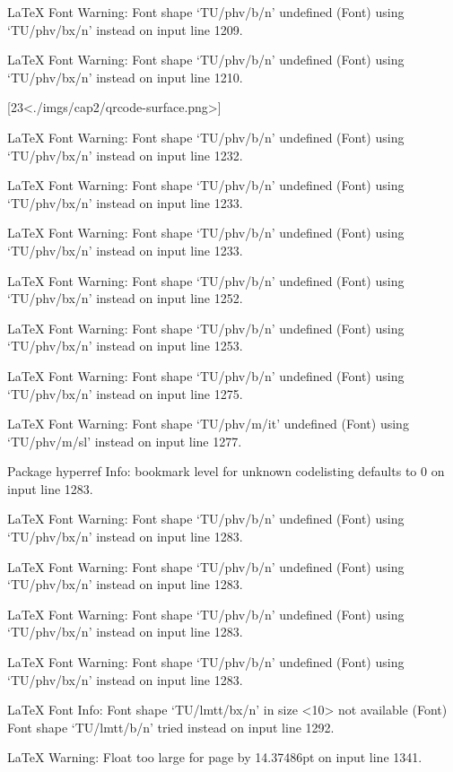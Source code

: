 LaTeX Font Warning: Font shape `TU/phv/b/n' undefined
(Font)              using `TU/phv/bx/n' instead on input line 1209.


LaTeX Font Warning: Font shape `TU/phv/b/n' undefined
(Font)              using `TU/phv/bx/n' instead on input line 1210.

[23<./imgs/cap2/qrcode-surface.png>]

LaTeX Font Warning: Font shape `TU/phv/b/n' undefined
(Font)              using `TU/phv/bx/n' instead on input line 1232.


LaTeX Font Warning: Font shape `TU/phv/b/n' undefined
(Font)              using `TU/phv/bx/n' instead on input line 1233.


LaTeX Font Warning: Font shape `TU/phv/b/n' undefined
(Font)              using `TU/phv/bx/n' instead on input line 1233.


LaTeX Font Warning: Font shape `TU/phv/b/n' undefined
(Font)              using `TU/phv/bx/n' instead on input line 1252.


LaTeX Font Warning: Font shape `TU/phv/b/n' undefined
(Font)              using `TU/phv/bx/n' instead on input line 1253.


LaTeX Font Warning: Font shape `TU/phv/b/n' undefined
(Font)              using `TU/phv/bx/n' instead on input line 1275.


LaTeX Font Warning: Font shape `TU/phv/m/it' undefined
(Font)              using `TU/phv/m/sl' instead on input line 1277.

Package hyperref Info: bookmark level for unknown codelisting defaults to 0 on input line 1283.

LaTeX Font Warning: Font shape `TU/phv/b/n' undefined
(Font)              using `TU/phv/bx/n' instead on input line 1283.


LaTeX Font Warning: Font shape `TU/phv/b/n' undefined
(Font)              using `TU/phv/bx/n' instead on input line 1283.


LaTeX Font Warning: Font shape `TU/phv/b/n' undefined
(Font)              using `TU/phv/bx/n' instead on input line 1283.


LaTeX Font Warning: Font shape `TU/phv/b/n' undefined
(Font)              using `TU/phv/bx/n' instead on input line 1283.

LaTeX Font Info:    Font shape `TU/lmtt/bx/n' in size <10> not available
(Font)              Font shape `TU/lmtt/b/n' tried instead on input line 1292.

LaTeX Warning: Float too large for page by 14.37486pt on input line 1341.


